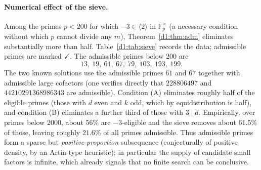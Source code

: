 \documentclass[a4paper]{article}
\theoremstyle{plain}
\theoremstyle{definition}
\theoremstyle{remark}
\newcommand{\F}{\mathbb{F}}
\newcommand{\gen}[1]{\langle #1 \rangle}
\begin{document}
\paragraph{Numerical effect of the sieve.}
Among the primes $p<200$ for which $-3\in\gen{2}$ in $\F_{p}^{\times}$ (a necessary condition
without which $p$ cannot divide any $m$), Theorem~\ref{d1:thm:adm} eliminates substantially more
than half. Table~\ref{d1:tab:sieve} records the data; admissible primes are marked $\checkmark$.
The admissible primes below $200$ are
\[
13,\ 19,\ 61,\ 67,\ 79,\ 103,\ 193,\ 199.
\]
The two known solutions use the admissible primes $61$ and $67$ together with admissible large
cofactors (one verifies directly that $228806497$ and $44210291368986343$ are admissible).
Condition (A) eliminates roughly half of the eligible primes (those with $d$ even and $k$ odd,
which by equidistribution is half), and condition (B) eliminates a further third of those with
$3\mid d$. Empirically, over primes below $2000$, about $56\%$ are $-3$-eligible and the sieve
removes about $61.5\%$ of those, leaving roughly $21.6\%$ of all primes admissible. Thus
admissible primes form a sparse but \emph{positive-proportion} subsequence (conjecturally of
positive density, by an Artin-type heuristic); in particular the supply of candidate small
factors is infinite, which already signals that no finite search can be conclusive.
\end{document}
